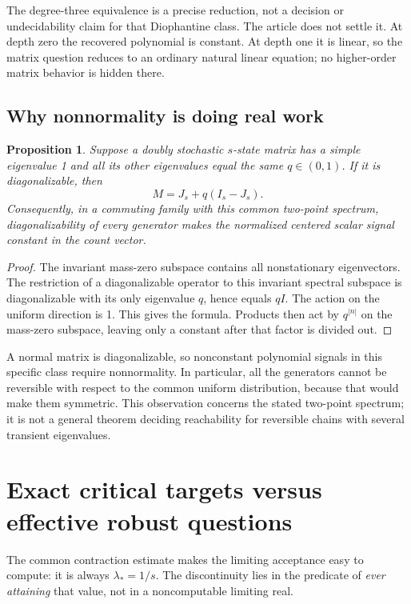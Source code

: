\documentclass[11pt,letterpaper]{article}
\newtheorem{proposition}[theorem]{Proposition}
\theoremstyle{definition}
\theoremstyle{remark}
\begin{document}
The degree-three equivalence is a precise reduction, not a decision or
undecidability claim for that Diophantine class. The article does not settle it.
At depth zero the recovered polynomial is constant. At depth one it is linear,
so the matrix question reduces to an ordinary natural linear equation; no
higher-order matrix behavior is hidden there.

\subsection{Why nonnormality is doing real work}

\begin{proposition}\label{ste:mx:prop:nonnormal}
Suppose a doubly stochastic $s$-state matrix has a simple eigenvalue 1 and all
its other eigenvalues equal the same $q\in(0,1)$. If it is diagonalizable, then
\[
 M=J_s+q(I_s-J_s).
\]
Consequently, in a commuting family with this common two-point spectrum,
diagonalizability of every generator makes the normalized centered scalar
signal constant in the count vector.
\end{proposition}
\begin{proof}
The invariant mass-zero subspace contains all nonstationary eigenvectors.
The restriction of a diagonalizable operator to this invariant spectral
subspace is diagonalizable with its only eigenvalue $q$, hence equals $qI$.
The action on the uniform direction is 1. This gives the formula. Products
then act by $q^{|n|}$ on the mass-zero subspace, leaving only a constant after
that factor is divided out.
\end{proof}

A normal matrix is diagonalizable, so nonconstant polynomial signals in this
specific class require nonnormality. In particular, all the generators cannot
be reversible with respect to the common uniform distribution, because that
would make them symmetric. This observation concerns the stated two-point
spectrum; it is not a general theorem deciding reachability for reversible
chains with several transient eigenvalues.

\section{Exact critical targets versus effective robust questions}\label{ste:mx:sec:robust}

The common contraction estimate makes the limiting acceptance easy to compute:
it is always $\lambda_*=1/s$. The discontinuity lies in the predicate of
\emph{ever attaining} that value, not in a noncomputable limiting real.
\end{document}
